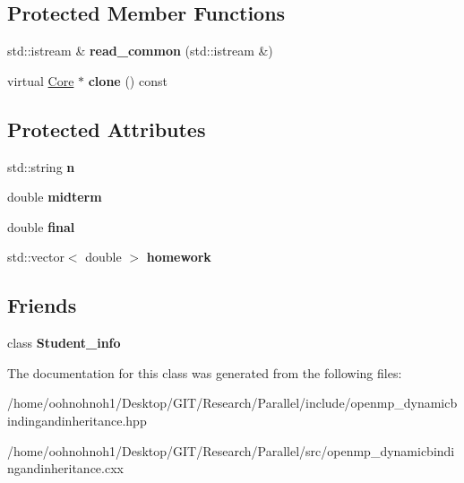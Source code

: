 \subsection*{Protected Member Functions}
\begin{DoxyCompactItemize}
\item 
\mbox{\label{classCore_a05a303331fa92fae980dca24267a870e}} 
std\+::istream \& {\bfseries read\+\_\+common} (std\+::istream \&)
\item 
\mbox{\label{classCore_ae781fdf236da68fabe00b8207608078b}} 
virtual \hyperlink{classCore}{Core} $\ast$ {\bfseries clone} () const
\end{DoxyCompactItemize}
\subsection*{Protected Attributes}
\begin{DoxyCompactItemize}
\item 
\mbox{\label{classCore_ac0329babd9f22f8858acbedb9e4346dc}} 
std\+::string {\bfseries n}
\item 
\mbox{\label{classCore_a0af6c4fa1fe57bc1eb500d16dd546202}} 
double {\bfseries midterm}
\item 
\mbox{\label{classCore_aa6cd0056b25e33c985fc8e347b9ed377}} 
double {\bfseries final}
\item 
\mbox{\label{classCore_a2975c3a0120d19df7bd74f40d518c3ef}} 
std\+::vector$<$ double $>$ {\bfseries homework}
\end{DoxyCompactItemize}
\subsection*{Friends}
\begin{DoxyCompactItemize}
\item 
\mbox{\label{classCore_a3697f82fec59c97d4afdca80e2f07686}} 
class {\bfseries Student\+\_\+info}
\end{DoxyCompactItemize}


The documentation for this class was generated from the following files\+:\begin{DoxyCompactItemize}
\item 
/home/oohnohnoh1/\+Desktop/\+G\+I\+T/\+Research/\+Parallel/include/openmp\+\_\+dynamicbindingandinheritance.\+hpp\item 
/home/oohnohnoh1/\+Desktop/\+G\+I\+T/\+Research/\+Parallel/src/openmp\+\_\+dynamicbindingandinheritance.\+cxx\end{DoxyCompactItemize}
